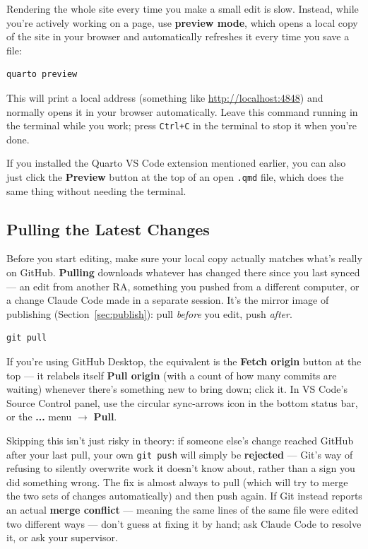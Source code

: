 \documentclass[11pt]{article}
\newcommand{\term}[1]{\textbf{#1}}
\newcommand{\file}[1]{\texttt{#1}}
\newcommand{\cmd}[1]{\texttt{#1}}
\begin{document}
Rendering the whole site every time you make a small edit is slow. Instead,
while you're actively working on a page, use \term{preview mode}, which
opens a local copy of the site in your browser and automatically refreshes
it every time you save a file:

\begin{lstlisting}
quarto preview
\end{lstlisting}

This will print a local address (something like
\url{http://localhost:4848}) and normally opens it in your browser
automatically. Leave this command running in the terminal while you work;
press \cmd{Ctrl+C} in the terminal to stop it when you're done.

If you installed the Quarto VS Code extension mentioned earlier, you can
also just click the \textbf{Preview} button at the top of an open
\file{.qmd} file, which does the same thing without needing the terminal.

\subsection{Pulling the Latest Changes}
\label{sec:pull}

Before you start editing, make sure your local copy actually matches
what's really on GitHub. \term{Pulling} downloads whatever has changed
there since you last synced --- an edit from another RA, something you
pushed from a different computer, or a change Claude Code made in a
separate session. It's the mirror image of publishing
(Section~\ref{sec:publish}): pull \emph{before} you edit, push
\emph{after}.

\begin{lstlisting}
git pull
\end{lstlisting}

If you're using GitHub Desktop, the equivalent is the
\textbf{Fetch origin} button at the top --- it relabels itself
\textbf{Pull origin} (with a count of how many commits are waiting)
whenever there's something new to bring down; click it. In VS Code's
Source Control panel, use the circular sync-arrows icon in the bottom
status bar, or the \textbf{...} menu $\to$ \textbf{Pull}.

Skipping this isn't just risky in theory: if someone else's change
reached GitHub after your last pull, your own \cmd{git push} will
simply be \term{rejected} --- Git's way of refusing to silently
overwrite work it doesn't know about, rather than a sign you did
something wrong. The fix is almost always to pull (which will try to
merge the two sets of changes automatically) and then push again. If
Git instead reports an actual \term{merge conflict} --- meaning the
same lines of the same file were edited two different ways --- don't
guess at fixing it by hand; ask Claude Code to resolve it, or ask your
supervisor.
\end{document}
